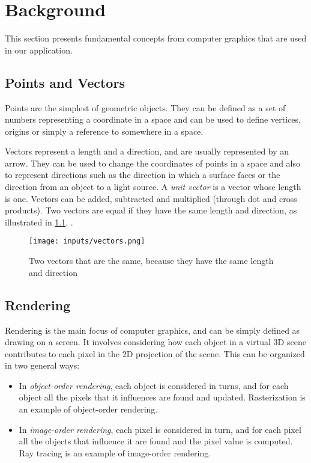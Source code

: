 \documentclass[cic,tc,english]{iiufrgs}
\begin{document}


\chapter{Background}
\label{backgroundchapter}
This section presents fundamental concepts from computer graphics that are used in our application.

\section{Points and Vectors}

Points are the simplest of geometric objects. They can be defined as a set of numbers representing a coordinate in a space and can be used to define vertices, origins or simply a reference to somewhere in a space.

Vectors represent a length and a direction, and are usually represented by an arrow. They can be used to change the coordinates of points in a space and also to represent directions such as the direction in which a surface faces or the direction from an object to a light source. A \textit{unit vector} is a vector whose length is one. Vectors can be added, subtracted and multiplied (through dot and cross products). Two vectors are equal if they have the same length and direction, as illustrated in \cref{samevectors}.  \cite{Marschner2021CGFundamentals}.

\begin{figure}[hbt!]
    \caption{Two vectors that are the same, because they have the same length and direction}
    \begin{center}
        \texttt{[image: inputs/vectors.png]}
    \end{center}
    \label{samevectors}
\end{figure}


\section{Rendering}

Rendering is the main focus of computer graphics, and can be simply defined as drawing on a screen. It involves considering how each object in a virtual 3D scene contributes to each pixel in the 2D projection of the scene. This can be organized in two general ways:
\begin{itemize}
    \item In \textit{object-order rendering}, each object is considered in turns, and for each object all the pixels that it influences are found and updated. Rasterization is an example of object-order rendering.
    \item In \textit{image-order rendering}, each pixel is considered in turn, and for each pixel all the objects that influence it are found and the pixel value is computed. Ray tracing is an example of image-order rendering.
\end{itemize}
\end{document}
